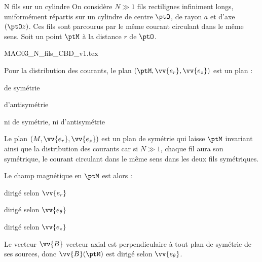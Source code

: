 \begin{exo}[PC][1][appli]{N fils sur un cylindre}
\initialisationPartieGauche 
On considère $N\gg1$ fils rectilignes infiniment longs, uniformément répartis
sur un cylindre de centre $\ptO$, de rayon $a$ et d'axe $(\ptO z)$. Ces fils
sont parcourus par le même courant circulant dans le même sens.
Soit un point $\ptM$ à la distance $r$ de $\ptO$.
\initialisationPartieDroite

\begin{center}
{MAG03_N_fils_CBD_v1.tex}
\end{center}                                         
\finalisationDuPartageDePage					
	\begin{quest}
		\item	
		Pour la distribution des courants, le plan $(\ptM,\vv{e_r},\vv{e_z})$ est un plan :
		\begin{listeQCM2Colonnes}
			\item de symétrie
			\item d'antisymétrie
			\item ni de symétrie, ni d'antisymétrie
		\end{listeQCM2Colonnes}

		\begin{corrige}
			Le plan $(M, \vv{e_r}, \vv{e_z})$ est un plan de symétrie qui laisse $\ptM$ invariant ainsi que la distribution des courants car si $N\gg1$, chaque fil aura son symétrique, le courant circulant dans le même sens dans les deux fils symétriques.
		\end{corrige}

		\vspace{0.5cm}
			\item 
			Le champ magnétique en $\ptM$ est alors :
			\begin{listeQCM2Colonnes}
				\item dirigé selon $\vv{e_r}$
				\item dirigé selon $\vv{e_\theta}$
				\item dirigé selon $\vv{e_z}$
			\end{listeQCM2Colonnes}

		\begin{corrige} 
			Le vecteur $\vv{B}$ vecteur axial est perpendiculaire à tout plan de symétrie de ses sources, donc $\vv{B}(\ptM)$ est dirigé selon $\vv{e_\theta}$.
		\end{corrige}
		\vspace{0.5cm}
	\end{quest}
\end{exo}

